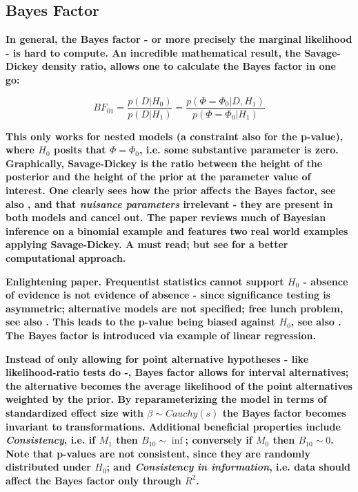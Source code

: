 \documentclass[12pt]{scrartcl}
\begin{document}
\subsection{Bayes Factor}
\begin{description}
  \item {}
  
  \item {}
  
  \item {}
  
  \textbf{In general, the Bayes factor - or more precisely the marginal likelihood - is hard to compute. An incredible mathematical result, the Savage-Dickey density ratio, allows one to calculate the Bayes factor in one go:}
  
  \begin{equation*}
    BF_{01} = \frac{p(D|H_0)}{p(D|H_1)} = \frac{p(\Phi = \Phi_0|D, H_1)}{p(\Phi = \Phi_0|H_1)}
  \end{equation*}
  
  \textbf{This only works for nested models (a constraint also for the p-value), where $H_0$ posits that $\Phi = \Phi_0$, i.e. some substantive parameter is zero. Graphically, Savage-Dickey is the ratio between the height of the posterior and the height of the prior at the parameter value of interest. One clearly sees how the prior affects the Bayes factor, see also \cite{liu2008bayes}, and that \emph{nuisance parameters} irrelevant - they are present in both models and cancel out. The paper reviews much of Bayesian inference on a binomial example and features two real world examples applying Savage-Dickey. A must read; but see \cite{morey2011using} for a better computational approach.}
  
  \item {}
  
  \textbf{Enlightening paper. Frequentist statistics cannot support $H_0$ - absence of evidence is not evidence of absence - since significance testing is asymmetric; alternative models are not specified; free lunch problem, see also \cite{rouder2014lunch}. This leads to the p-value being biased against $H_0$, see also \cite{wagenmakers2007practical, rouder2009bayesian}. The Bayes factor is introduced via example of linear regression.}
  
  \textbf{Instead of only allowing for point alternative hypotheses - like likelihood-ratio tests do -, Bayes factor allows for interval alternatives; the alternative becomes the average likelihood of the point alternatives weighted by the prior. By reparameterizing the model in terms of standardized effect size with $\beta \sim Cauchy(s)$ the Bayes factor becomes invariant to transformations. Additional beneficial properties include \emph{Consistency}, i.e. if $M_1$ then $B_{10} \sim \inf$; conversely if $M_0$ then $B_{10} \sim 0$. Note that p-values are not consistent, since they are randomly distributed under $H_0$; and \emph{Consistency in information}, i.e. data should affect the Bayes factor only through $R^2$.}
  

\end{description}
\end{document}
